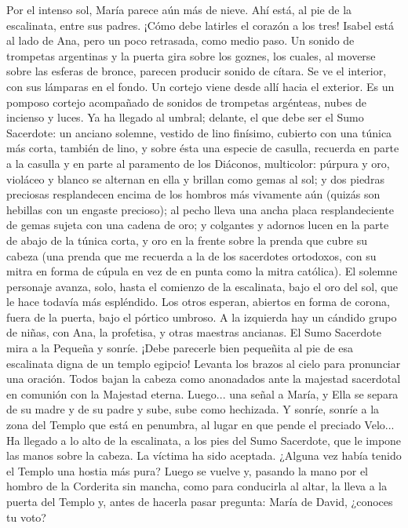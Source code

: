 \documentclass[12pt]{book} %
\begin{document}
Por el intenso sol, María parece aún más de nieve. Ahí está, al pie de la escalinata, entre sus padres. ¡Cómo debe latirles 
el corazón a los tres! Isabel está al lado de Ana, pero un poco retrasada, como medio paso. 
Un sonido de trompetas argentinas y la puerta gira sobre los goznes, los cuales, al moverse sobre las esferas de bronce, 
parecen producir sonido de cítara. Se ve el interior, con sus lámparas en el fondo. Un cortejo viene desde allí hacia el exterior. Es un pomposo cortejo acompañado de sonidos de trompetas argénteas, nubes de incienso y luces. 
Ya ha llegado al umbral; delante, el que debe ser el Sumo Sacerdote: un anciano solemne, vestido de lino finísimo, 
cubierto con una túnica más corta, también de lino, y sobre ésta una especie de casulla, recuerda en parte a la casulla y en parte al paramento de los Diáconos, multicolor: púrpura y oro, violáceo y blanco se alternan en ella y brillan como gemas al sol; y dos piedras preciosas resplandecen encima de los hombros más vivamente aún (quizás son hebillas con un engaste precioso); al pecho lleva una ancha placa resplandeciente de gemas sujeta con una cadena de oro; y colgantes y adornos lucen en la parte de abajo de la túnica corta, y oro en la frente sobre la prenda que cubre su cabeza (una prenda que me recuerda a la de los sacerdotes ortodoxos, con su mitra en forma de cúpula en vez de en punta como la mitra católica). 
El solemne personaje avanza, solo, hasta el comienzo de la escalinata, bajo el oro del sol, que le hace todavía más 
espléndido. Los otros esperan, abiertos en forma de corona, fuera de la puerta, bajo el pórtico umbroso. A la izquierda hay un cándido grupo de niñas, con Ana, la profetisa, y otras maestras ancianas. 
El Sumo Sacerdote mira a la Pequeña y sonríe. ¡Debe parecerle bien pequeñita al pie de esa escalinata digna de un templo egipcio! Levanta los brazos al cielo para pronunciar una oración. Todos bajan la cabeza como anonadados ante la majestad sacerdotal en comunión con la Majestad eterna. 
Luego... una señal a María, y Ella se separa de su madre y de su padre y sube, sube como hechizada. Y sonríe, sonríe a la 
zona del Templo que está en penumbra, al lugar en que pende el preciado Velo... Ha llegado a lo alto de la escalinata, a los pies del Sumo Sacerdote, que le impone las manos sobre la cabeza. La víctima ha sido aceptada. ¿Alguna vez había tenido el Templo una hostia más pura? 
Luego se vuelve y, pasando la mano por el hombro de la Corderita sin mancha, como para conducirla al altar, la lleva a 
la puerta del Templo y, antes de hacerla pasar pregunta: 
María de David, ¿conoces tu voto? 
\end{document}
